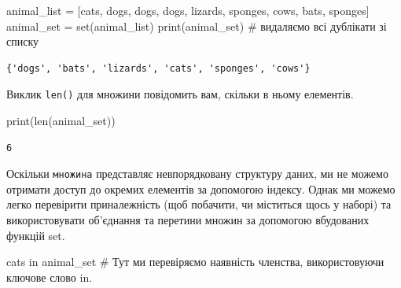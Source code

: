 \documentclass[
  letterpaper,
]{report}
\newenvironment{Shaded}{\begin{snugshade}}{\end{snugshade}}
\newcommand{\BuiltInTok}[1]{\textcolor[rgb]{0.00,0.23,0.31}{#1}}
\newcommand{\CommentTok}[1]{\textcolor[rgb]{0.37,0.37,0.37}{#1}}
\newcommand{\KeywordTok}[1]{\textcolor[rgb]{0.00,0.23,0.31}{#1}}
\newcommand{\NormalTok}[1]{\textcolor[rgb]{0.00,0.23,0.31}{#1}}
\newcommand{\OperatorTok}[1]{\textcolor[rgb]{0.37,0.37,0.37}{#1}}
\newcommand{\StringTok}[1]{\textcolor[rgb]{0.13,0.47,0.30}{#1}}
\begin{document}
\begin{Shaded}
\begin{Highlighting}[]
\NormalTok{animal\_list }\OperatorTok{=}\NormalTok{ [}\StringTok{\textquotesingle{}cats\textquotesingle{}}\NormalTok{, }\StringTok{\textquotesingle{}dogs\textquotesingle{}}\NormalTok{, }\StringTok{\textquotesingle{}dogs\textquotesingle{}}\NormalTok{, }\StringTok{\textquotesingle{}dogs\textquotesingle{}}\NormalTok{, }\StringTok{\textquotesingle{}lizards\textquotesingle{}}\NormalTok{, }\StringTok{\textquotesingle{}sponges\textquotesingle{}}\NormalTok{, }\StringTok{\textquotesingle{}cows\textquotesingle{}}\NormalTok{, }\StringTok{\textquotesingle{}bats\textquotesingle{}}\NormalTok{, }\StringTok{\textquotesingle{}sponges\textquotesingle{}}\NormalTok{]}
\NormalTok{animal\_set }\OperatorTok{=} \BuiltInTok{set}\NormalTok{(animal\_list)}
\BuiltInTok{print}\NormalTok{(animal\_set) }\CommentTok{\# видаляємо всі дублікати зі списку}
\end{Highlighting}
\end{Shaded}

\begin{verbatim}
{'dogs', 'bats', 'lizards', 'cats', 'sponges', 'cows'}
\end{verbatim}

Виклик \texttt{len()} для множини повідомить вам, скільки в ньому
елементів.

\begin{Shaded}
\begin{Highlighting}[]
\BuiltInTok{print}\NormalTok{(}\BuiltInTok{len}\NormalTok{(animal\_set))}
\end{Highlighting}
\end{Shaded}

\begin{verbatim}
6
\end{verbatim}

Оскільки \texttt{множина} представляє невпорядковану структуру даних, ми
не можемо отримати доступ до окремих елементів за допомогою індексу.
Однак ми можемо легко перевірити приналежність (щоб побачити, чи
міститься щось у наборі) та використовувати об'єднання та перетини
множин за допомогою вбудованих функцій set.

\begin{Shaded}
\begin{Highlighting}[]
\CommentTok{\textquotesingle{}cats\textquotesingle{}} \KeywordTok{in}\NormalTok{ animal\_set }\CommentTok{\# Тут ми перевіряємо наявність членства, використовуючи ключове слово \textquotesingle{}in\textquotesingle{}.}
\end{Highlighting}
\end{Shaded}
\end{document}
